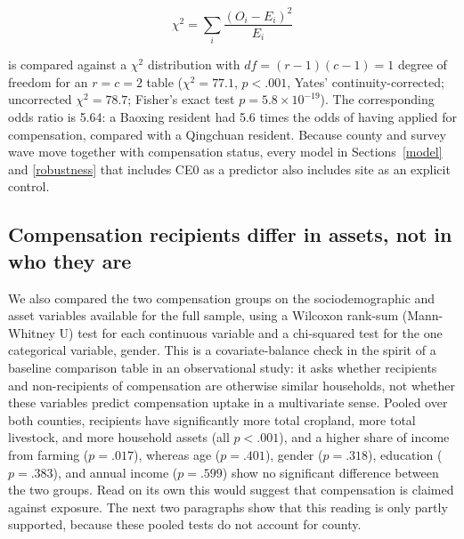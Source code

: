 \begin{equation}
\chi^2 = \sum_{i} \frac{(O_i - E_i)^2}{E_i}
\label{eq:chisq}
\end{equation}

is compared against a $\chi^2$ distribution with $df = (r-1)(c-1) = 1$
degree of freedom for an $r=c=2$ table ($\chi^2 = 77.1$, $p < .001$, Yates'
continuity-corrected; uncorrected $\chi^2 = 78.7$; Fisher's exact test
$p = 5.8\times10^{-19}$). The corresponding odds ratio is 5.64: a Baoxing
resident had 5.6 times the odds of having applied for compensation, compared
with a Qingchuan resident. Because county and survey wave move together with
compensation status, every model in Sections~\ref{model} and
\ref{robustness} that includes CE0 as a predictor also includes site as an
explicit control.

\subsection{Compensation recipients differ in assets, not in who they are}
\label{data:balance}

We also compared the two compensation groups on the sociodemographic and
asset variables available for the full sample, using a Wilcoxon rank-sum
(Mann-Whitney U) test for each continuous variable and a chi-squared test for
the one categorical variable, gender. This is a covariate-balance check in
the spirit of a baseline comparison table in an observational study: it asks
whether recipients and non-recipients of compensation are otherwise similar
households, not whether these variables predict compensation uptake in a
multivariate sense. Pooled over both counties, recipients have significantly more total
cropland, more total livestock, and more household assets (all $p < .001$),
and a higher share of income from farming ($p = .017$), whereas age
($p = .401$), gender ($p = .318$), education ($p = .383$), and annual income
($p = .599$) show no significant difference between the two groups. Read
on its own this would suggest that compensation is claimed against exposure.
The next two paragraphs show that this reading is only partly supported,
because these pooled tests do not account for county.

